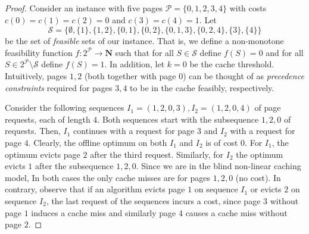 \documentclass[11pt]{article}
\newcommand{\cA}{{\mathcal{A}}}
\newcommand{\cP}{{\mathcal{P}}}
\newcommand{\cS}{{\mathcal{S}}}
\begin{document}
{\begin{proof}
	Consider an instance with five pages $\cP = \{0,1,2,3,4\}$ with costs $c(0) = c(1) = c(2) = 0$ and $c(3) = c(4) = 1$. %
	Let $$\cS = \big\{\emptyset,\{1\},\{1,2\}, \{0,1\}, \{0,2\}, \{0,1,3\},\{0,2,4\}, \{3\},\{4\} \big\}$$
	be the set of {\em feasible} sets of our instance. That is, we define a non-monotone feasibility function $f: 2^{\cP} \rightarrow \mathbf{N}$  such that for all $S \in \cS$ define $f(S) = 0$ and for all $S \in 2^{\cP} \setminus \cS$ define $f(S) = 1$. In addition, let $k = 0$ be the cache threshold.  
 Intuitively, pages $1,2$ (both together with page $0$) can be thought of as {\em precedence constraints} required for pages $3,4$ to be in the cache feasibly, %
  respectively. 
 
 Consider the following sequences $I_1 = (1,2,0,3),I_2 = (1,2,0,4)$ of page requests, each of length $4$. Both sequences start with the subsequence $1,2,0$ of requests. %
 Then, $I_1$ continues with a request for page $3$ and $I_2$ with a request for page $4$. Clearly, the offline optimum on both $I_1$ and $I_2$ is of cost $0$.  For $I_1$, the optimum evicts page $2$ after the third request. Similarly, for $I_2$ the optimum evicts $1$ after the subsequence $1,2,0$. Since we are in the blind non-linear caching model, In both cases the only cache misses are for pages $1,2,0$ (no cost).  In contrary, observe that if an algorithm evicts page $1$ on sequence $I_1$ or evicts $2$ on sequence $I_2$, the last request of the sequences incurs a cost, since page $3$ without page $1$ induces a cache miss and similarly page $4$ causes a cache miss without page $2$. %
 

\end{proof}}
\end{document}
